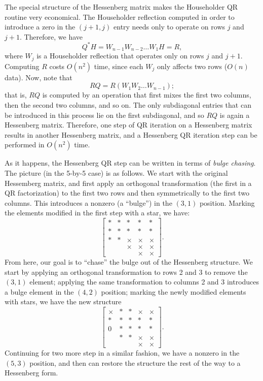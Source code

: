 \documentclass[12pt, leqno]{article} %
\begin{document}
The special structure of the Hessenberg matrix makes the Householder
QR routine very economical.  The Householder reflection computed in
order to introduce a zero in the $(j+1,j)$ entry needs only to operate
on rows $j$ and $j+1$.  Therefore, we have
\[
  Q^* H = W_{n-1} W_{n-2} \ldots W_1 H = R,
\]
where $W_{j}$ is a Householder reflection that operates only on rows
$j$ and $j+1$.  Computing $R$ costs $O(n^2)$ time, since each $W_j$
only affects two rows ($O(n)$ data).  Now, note that
\[
  R Q = R (W_1 W_2 \ldots W_{n-1});
\]
that is, $RQ$ is computed by an operation that first mixes the first
two columns, then the second two columns, and so on.  The only subdiagonal
entries that can be introduced in this process lie on the first subdiagonal,
and so $RQ$ is again a Hessenberg matrix.  Therefore, one step of QR iteration
on a Hessenberg matrix results in another Hessenberg matrix, and a Hessenberg
QR iteration step can be performed in $O(n^2)$ time.

As it happens, the Hessenberg QR step can be written in terms of {\em
  bulge chasing}.  The picture (in the 5-by-5 case) is as follows.  We
start with the original Hessemberg matrix, and first apply an
orthogonal transformation (the first in a QR factorization) to the
first two rows and then symmetrically to the first two columns.  This
introduces a nonzero (a ``bulge'') in the $(3,1)$ position.  Marking
the elements modified in the first step with a star, we have:
\[
  \begin{bmatrix}
    * & * & * & * & * \\
    * & * & * & * & * \\
    * & * & \times & \times & \times \\
           &        & \times & \times & \times \\
           &        &        & \times & \times 
  \end{bmatrix}.
\]
From here, our goal is to ``chase'' the bulge out of the Hessenberg
structure.  We start by applying an orthogonal transformation to rows
2 and 3 to remove the $(3,1)$ element; applying the same
transformation to columns 2 and 3 introduces a bulge element in the
$(4,2)$ position; marking the newly modified elements with stars,
we have the new structure
\[
  \begin{bmatrix}
    \times & * & * & \times & \times \\
    * & * & * & * & * \\
    0 & * & * & * & * \\
           & * & * & \times & \times \\
           &        &        & \times & \times 
  \end{bmatrix}.
\]
Continuing for two more step in a similar fashion, we have a nonzero
in the $(5,3)$ position, and then can restore the structure the rest
of the way to a Hessenberg form.
\end{document}
